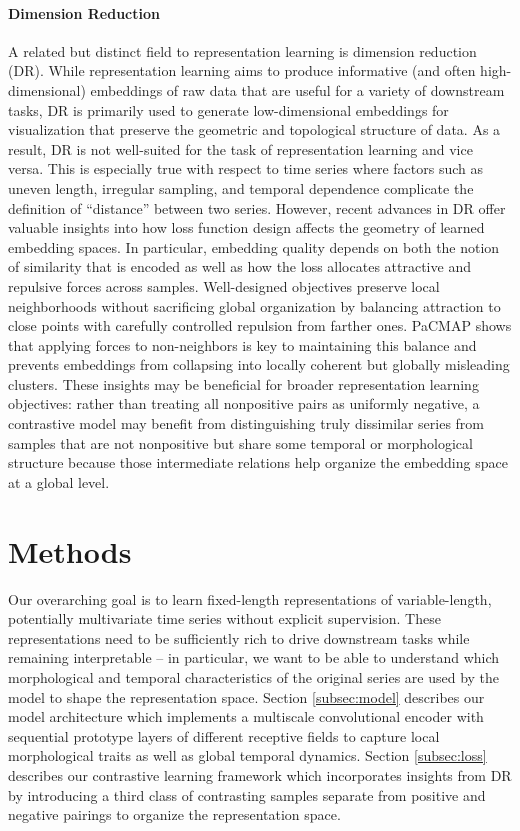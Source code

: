 \documentclass{article}
\begin{document}
\paragraph{Dimension Reduction} 

A related but distinct field to representation learning is dimension reduction (DR). While representation learning aims to produce informative (and often high-dimensional) embeddings of raw data that are useful for a variety of downstream tasks, DR is primarily used to generate low-dimensional embeddings for visualization that preserve the geometric and topological structure of data. As a result, DR is not well-suited for the task of representation learning and vice versa. This is especially true with respect to time series where factors such as uneven length, irregular sampling, and temporal dependence complicate the definition of ``distance'' between two series. However, recent advances in DR offer valuable insights into how loss function design affects the geometry of learned embedding spaces. In particular, embedding quality depends on both the notion of similarity that is encoded as well as how the loss allocates attractive and repulsive forces across samples. Well-designed objectives preserve local neighborhoods without sacrificing global organization by balancing attraction to close points with carefully controlled repulsion from farther ones. PaCMAP \cite{wang20-pacmap} shows that applying forces to non-neighbors is key to maintaining this balance and prevents embeddings from collapsing into locally coherent but globally misleading clusters. These insights may be beneficial for broader representation learning objectives: rather than treating all nonpositive pairs as uniformly negative, a contrastive model may benefit from distinguishing truly dissimilar series from samples that are not nonpositive but share some temporal or morphological structure because those intermediate relations help organize the embedding space at a global level. 


\section{Methods}
\label{sec:methods}

Our overarching goal is to learn fixed-length representations of variable-length, potentially multivariate time series without explicit supervision. These representations need to be sufficiently rich to drive downstream tasks while remaining interpretable -- in particular, we want to be able to understand which morphological and temporal characteristics of the original series are used by the model to shape the representation space. Section \ref{subsec:model} describes our model architecture which implements a multiscale convolutional encoder with sequential prototype layers of different receptive fields to capture local morphological traits as well as global temporal dynamics. Section \ref{subsec:loss} describes our contrastive learning framework which incorporates insights from DR by introducing a third class of contrasting samples separate from positive and negative pairings to organize the representation space. 
\end{document}
